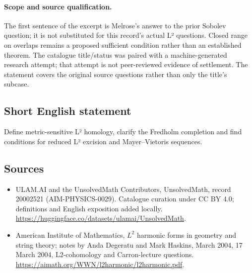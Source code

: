 \documentclass[11pt]{article}
\begin{document}
\paragraph{Scope and source qualification.}The first sentence of the excerpt is Melrose’s answer to the prior Sobolev question; it is not substituted for this record’s actual L² questions. Closed range on overlaps remains a proposed sufficient condition rather than an established theorem. The catalogue title/status was paired with a machine-generated research attempt; that attempt is not peer-reviewed evidence of settlement. The statement covers the original source questions rather than only the title’s subcase.
\subsection{Short English statement}
Define metric-sensitive L² homology, clarify the Fredholm completion and find conditions for reduced L² excision and Mayer–Vietoris sequences.
\subsection{Sources}
\begin{itemize}
\item[\hypertarget{source:20002521:1}{S1}] ULAM.AI and the UnsolvedMath Contributors, UnsolvedMath, record 20002521 (AIM-PHYSICS-0029). Catalogue curation under CC BY 4.0; definitions and English exposition added locally.
\url{https://huggingface.co/datasets/ulamai/UnsolvedMath}.
\item[\hypertarget{source:20002521:2}{S2}] American Institute of Mathematics, $L^2$ harmonic forms in geometry and string theory; notes by Anda Degeratu and Mark Haskins, March 2004, 17 March 2004, L2-cohomology and Carron-lecture questions.
\url{https://aimath.org/WWN/l2harmonic/l2harmonic.pdf}.
\end{itemize}
\label{end:20002521}
\end{document}
